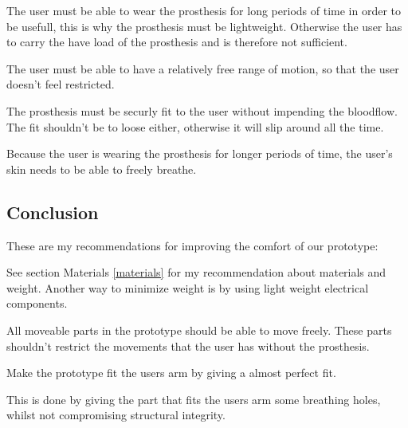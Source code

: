\documentclass[11pt, a4paper]{article}
\begin{document}
\begin{description}[align=left]
    \item[Weight] The user must be able to wear the prosthesis for long periods of time in order to be usefull, this is why the prosthesis must be lightweight.
                  Otherwise the user has to carry the have load of the prosthesis and is therefore not sufficient.
    \item[Range of motion] The user must be able to have a relatively free range of motion, so that the user doesn't feel restricted.                       
    \item[Fit] The prosthesis must be securly fit to the user without impending the bloodflow.
               The fit shouldn't be to loose either, otherwise it will slip around all the time. 
    \item[Breathability] Because the user is wearing the prosthesis for longer periods of time, the user's skin needs to be able to freely breathe.   
\end{description}

\subsection{Conclusion}
These are my recommendations for improving the comfort of our prototype:
\begin{description}[align=left]
    \item[Weight] See section Materials \ref{materials} for my recommendation about materials and weight.
                  Another way to minimize weight is by using light weight electrical components. 
    \item[Range of motion] All moveable parts in the prototype should be able to move freely.
                           These parts shouldn't restrict the movements that the user has without the prosthesis.  
    \item[Fit] Make the prototype fit the users arm by giving a almost perfect fit.
    \item[Breathability] This is done by giving the part that fits the users arm some breathing holes, whilst not compromising structural integrity.
\end{description}

\newpage


\end{document}
